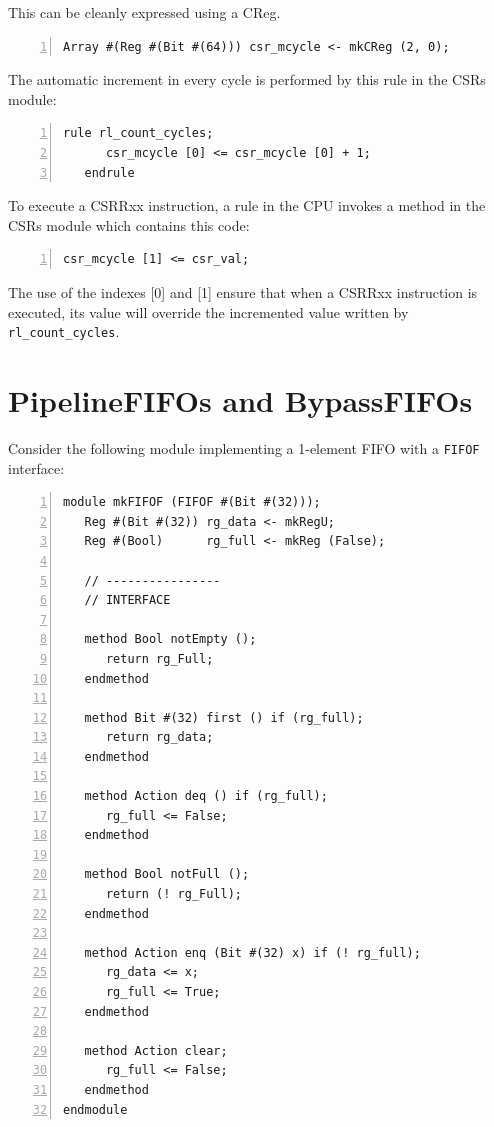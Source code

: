 This can be cleanly expressed using a CReg.

{\footnotesize
\begin{Verbatim}[frame=single, numbers=left, label=from src\_Common/CSRs.bsv]
   Array #(Reg #(Bit #(64))) csr_mcycle <- mkCReg (2, 0);
\end{Verbatim}
}

The automatic increment in every cycle is performed by this rule in
the CSRs module:
{\footnotesize
\begin{Verbatim}[frame=single, numbers=left, label=from src\_Common/CSRs.bsv]
   rule rl_count_cycles;
      csr_mcycle [0] <= csr_mcycle [0] + 1;
   endrule
\end{Verbatim}
}

To execute a CSRRxx instruction, a rule in the CPU invokes a method in
the CSRs module which contains this code:

{\footnotesize
\begin{Verbatim}[frame=single, numbers=left, label=from src\_Common/CSRs.bsv]
   csr_mcycle [1] <= csr_val;
\end{Verbatim}
}

The use of the indexes [0] and [1] ensure that when a CSRRxx
instruction is executed, its value will override the incremented value
written by \verb|rl_count_cycles|.


\section{PipelineFIFOs and BypassFIFOs}

\label{Sec_SpecialFIFOs}

Consider the following module implementing a 1-element FIFO with a
\verb|FIFOF| interface:

{\footnotesize
\begin{Verbatim}[frame=single, numbers=left]
module mkFIFOF (FIFOF #(Bit #(32)));
   Reg #(Bit #(32)) rg_data <- mkRegU;
   Reg #(Bool)      rg_full <- mkReg (False);

   // ----------------
   // INTERFACE

   method Bool notEmpty ();
      return rg_Full;
   endmethod

   method Bit #(32) first () if (rg_full);
      return rg_data;
   endmethod

   method Action deq () if (rg_full);
      rg_full <= False;
   endmethod

   method Bool notFull ();
      return (! rg_Full);
   endmethod

   method Action enq (Bit #(32) x) if (! rg_full);
      rg_data <= x;
      rg_full <= True;
   endmethod

   method Action clear;
      rg_full <= False;
   endmethod
endmodule
\end{Verbatim}
}

